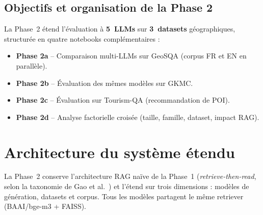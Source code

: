 \documentclass[12pt,a4paper]{article}
\begin{document}
\subsection{Objectifs et organisation de la Phase 2}

La Phase~2 \'etend l'\'evaluation \`a \textbf{5~LLMs} sur \textbf{3~datasets} g\'eographiques,
structur\'ee en quatre notebooks compl\'ementaires :

\begin{itemize}[leftmargin=*]
  \item \textbf{Phase 2a} -- Comparaison multi-LLMs sur GeoSQA (corpus FR et EN en parall\`ele).
  \item \textbf{Phase 2b} -- \'Evaluation des m\^emes mod\`eles sur GKMC.
  \item \textbf{Phase 2c} -- \'Evaluation sur Tourism-QA (recommandation de POI).
  \item \textbf{Phase 2d} -- Analyse factorielle crois\'ee (taille, famille, dataset, impact RAG).
\end{itemize}

\section{Architecture du syst\`eme \'etendu}
\label{sec:architecture}

La Phase~2 conserve l'architecture RAG na\"ive de la Phase~1 (\textit{retrieve-then-read},
selon la taxonomie de Gao et al.~\cite{gao2023ragsurvey}) et l'\'etend sur trois dimensions :
mod\`eles de g\'en\'eration, datasets et corpus. Tous les mod\`eles partagent le m\^eme
retriever (BAAI/bge-m3 + FAISS).
\end{document}
